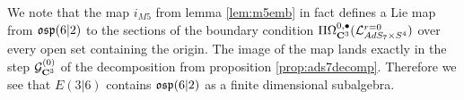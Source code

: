 \documentclass[../main.tex]{subfiles}
\begin{document}
\begin{rmk}
We note that the map $i_{M5}$ from lemma \ref{lem:m5emb} in fact defines a Lie map from $\mathfrak{osp}(6|2)$ to the sections of the boundary condition $\Pi \Omega^{0,\bullet}_{\mathbf{C}^3} (\mathcal{L}^{r=0}_{AdS_7\times S^4} )$ over every open set containing the origin. The image of the map lands exactly in the step $\mathcal{G}^{(0)}_{\mathbf{C}^3}$ of the decomposition from proposition \ref{prop:ads7decomp}. Therefore we see that $E(3|6)$ contains $\mathfrak{osp}(6|2)$ as a finite dimensional subalgebra.  
\end{rmk}

\end{document}

